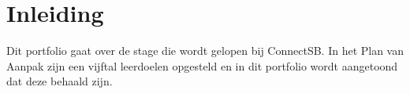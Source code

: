 \setcounter{page}{1}

\section{Inleiding}
Dit portfolio gaat over de stage die wordt gelopen bij ConnectSB. In het Plan van Aanpak zijn een vijftal leerdoelen opgesteld en in dit portfolio wordt aangetoond dat deze behaald zijn.